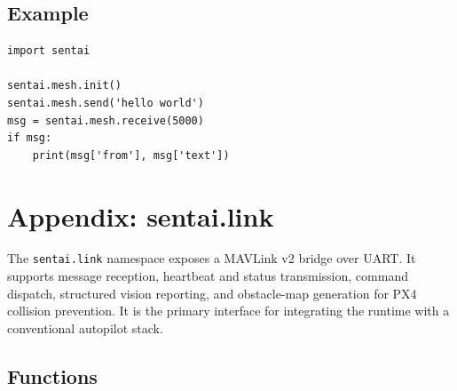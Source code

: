 \subsection{Example}\label{example-11}

\begin{verbatim}
import sentai

sentai.mesh.init()
sentai.mesh.send('hello world')
msg = sentai.mesh.receive(5000)
if msg:
    print(msg['from'], msg['text'])
\end{verbatim}

\section{Appendix: sentai.link}\label{appendix-sentai.link}

The \texttt{sentai.link} namespace exposes a MAVLink v2 bridge over
UART. It supports message reception, heartbeat and status transmission,
command dispatch, structured vision reporting, and obstacle-map
generation for PX4 collision prevention. It is the primary interface for
integrating the runtime with a conventional autopilot stack.

\subsection{Functions}\label{functions-12}

